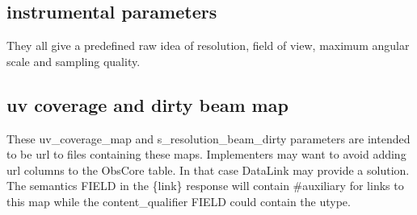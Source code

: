 \documentclass[11pt,a4paper]{ivoa}
\begin{document}
\subsection{instrumental parameters}

They all give a predefined raw idea of resolution, field of view, maximum angular scale and sampling quality.

\subsection{uv coverage and dirty beam map}

These uv\_coverage\_map and s\_resolution\_beam\_dirty parameters are  intended to be url to files containing these maps. 
Implementers may want to avoid adding url columns to the ObsCore table. In that case DataLink \citep{std:DataLink} may provide a solution. The semantics FIELD in the \{link\} response    will contain \#auxiliary  for links to this map while  the content\_qualifier FIELD could contain the utype.
\end{document}
